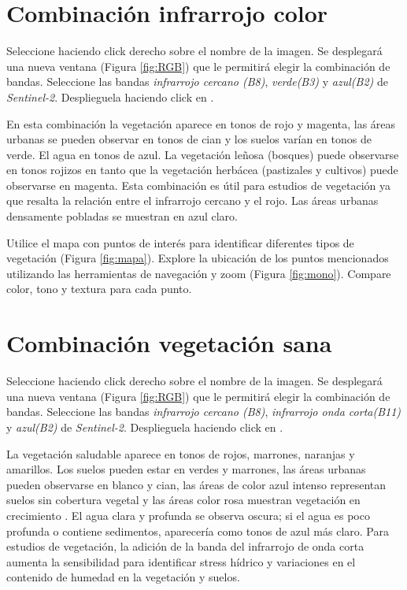 \section{Combinación infrarrojo color}
\label{sec:infrarrojocolor}

Seleccione  haciendo click derecho sobre el nombre de la imagen. Se desplegará una nueva ventana (Figura \ref{fig:RGB}) que le permitirá elegir la combinación de bandas. Seleccione las bandas \emph{infrarrojo cercano (B8)}, \emph{verde(B3)} y \emph{azul(B2)} de \emph{Sentinel-2}. Desplieguela haciendo click en .

En esta combinación la vegetación aparece en tonos de rojo y magenta, las áreas urbanas se pueden observar en tonos de cian y los suelos varían en tonos de verde. El agua en tonos de azul. La vegetación leñosa (bosques) puede observarse en tonos rojizos en tanto que la vegetación herbácea (pastizales y cultivos) puede observarse en magenta. Esta combinación es útil para estudios de vegetación ya que resalta la relación entre el infrarrojo cercano y el rojo. Las áreas urbanas densamente pobladas se muestran en azul claro.

Utilice el mapa con puntos de interés para identificar diferentes tipos de vegetación (Figura \ref{fig:mapa}). Explore la ubicación de los puntos mencionados utilizando las herramientas de navegación y zoom  (Figura \ref{fig:mono}). Compare color, tono y textura para cada punto.

\section{Combinación vegetación sana}
\label{sec:vegetacionsana}

Seleccione  haciendo click derecho sobre el nombre de la imagen. Se desplegará una nueva ventana (Figura \ref{fig:RGB}) que le permitirá elegir la combinación de bandas. Seleccione las bandas \emph{infrarrojo cercano (B8)}, \emph{infrarrojo onda corta(B11)} y \emph{azul(B2)} de \emph{Sentinel-2}. Desplieguela haciendo click en .

La vegetación saludable aparece en tonos de rojos, marrones, naranjas y amarillos. Los suelos pueden estar en verdes y marrones, las áreas urbanas pueden observarse en blanco y cian, las áreas de color azul intenso representan suelos sin cobertura vegetal y las áreas color rosa muestran vegetación en crecimiento . El agua clara y profunda se observa oscura; si el agua es poco profunda o contiene sedimentos, aparecería como tonos de azul más claro. Para estudios de vegetación, la adición de la banda del infrarrojo de onda corta aumenta la sensibilidad para identificar stress hídrico y variaciones en el contenido de humedad en la vegetación y suelos.

